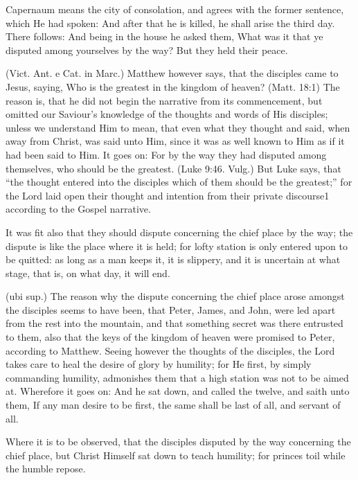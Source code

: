  Capernaum means the city of consolation, and agrees with the former sentence, which He had spoken: And after that he is killed, he shall arise the third day. There follows: And being in the house he asked them, What was it that ye disputed among yourselves by the way? But they held their peace.

 (Vict. Ant. e Cat. in Marc.) Matthew however says, that the disciples came to Jesus, saying, Who is the greatest in the kingdom of heaven? (Matt. 18:1) The reason is, that he did not begin the narrative from its commencement, but omitted our Saviour’s knowledge of the thoughts and words of His disciples; unless we understand Him to mean, that even what they thought and said, when away from Christ, was said unto Him, since it was as well known to Him as if it had been said to Him. It goes on: For by the way they had disputed among themselves, who should be the greatest. (Luke 9:46. Vulg.) But Luke says, that “the thought entered into the disciples which of them should be the greatest;” for the Lord laid open their thought and intention from their private discourse1 according to the Gospel narrative.

 It was fit also that they should dispute concerning the chief place by the way; the dispute is like the place where it is held; for lofty station is only entered upon to be quitted: as long as a man keeps it, it is slippery, and it is uncertain at what stage, that is, on what day, it will end.

 (ubi sup.) The reason why the dispute concerning the chief place arose amongst the disciples seems to have been, that Peter, James, and John, were led apart from the rest into the mountain, and that something secret was there entrusted to them, also that the keys of the kingdom of heaven were promised to Peter, according to Matthew. Seeing however the thoughts of the disciples, the Lord takes care to heal the desire of glory by humility; for He first, by simply commanding humility, admonishes them that a high station was not to be aimed at. Wherefore it goes on: And he sat down, and called the twelve, and saith unto them, If any man desire to be first, the same shall be last of all, and servant of all.

 Where it is to be observed, that the disciples disputed by the way concerning the chief place, but Christ Himself sat down to teach humility; for princes toil while the humble repose.

